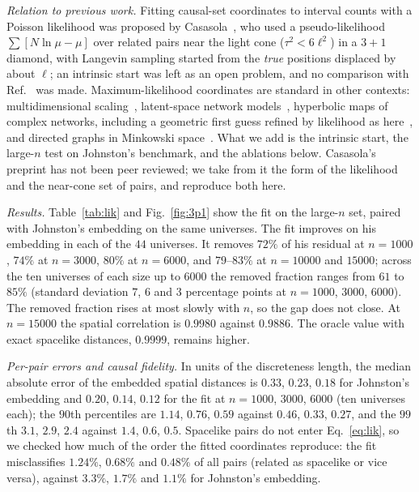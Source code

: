 \documentclass[prd,twocolumn,superscriptaddress,nofootinbib,amsmath,amssymb,floatfix]{revtex4-2}
\begin{document}
\emph{Relation to previous work.} Fitting causal-set coordinates to interval counts with a Poisson likelihood was proposed by Casasola~\cite{Casasola26}, who used a pseudo-likelihood $\sum[N\ln\mu-\mu]$ over related pairs near the light cone ($\tau^2<6\ell^2$) in a $3+1$ diamond, with Langevin sampling started from the \emph{true} positions displaced by about $\ell$; an intrinsic start was left as an open problem, and no comparison with Ref.~\cite{Johnston25} was made. Maximum-likelihood coordinates are standard in other contexts: multidimensional scaling~\cite{Ramsay77}, latent-space network models~\cite{Hoff02}, hyperbolic maps of complex networks, including a geometric first guess refined by likelihood as here~\cite{BPK10,Mercator19}, and directed graphs in Minkowski space~\cite{Sim21}. What we add is the intrinsic start, the large-$n$ test on Johnston's benchmark, and the ablations below. Casasola's preprint has not been peer reviewed; we take from it the form of the likelihood and the near-cone set of pairs, and reproduce both here.

\emph{Results.} Table~\ref{tab:lik} and Fig.~\ref{fig:3p1} show the fit on the large-$n$ set, paired with Johnston's embedding on the same universes. The fit improves on his embedding in each of the $44$ universes. It removes $72\%$ of his residual at $n=1000$, $74\%$ at $n=3000$, $80\%$ at $n=6000$, and $79$--$83\%$ at $n=10000$ and $15000$; across the ten universes of each size up to $6000$ the removed fraction ranges from $61$ to $85\%$ (standard deviation $7$, $6$ and $3$ percentage points at $n=1000$, $3000$, $6000$). The removed fraction rises at most slowly with $n$, so the gap does not close. At $n=15000$ the spatial correlation is $0.9980$ against $0.9886$. The oracle value with exact spacelike distances, $0.9999$, remains higher.

\emph{Per-pair errors and causal fidelity.} In units of the discreteness length, the median absolute error of the embedded spatial distances is $0.33$, $0.23$, $0.18$ for Johnston's embedding and $0.20$, $0.14$, $0.12$ for the fit at $n=1000$, $3000$, $6000$ (ten universes each); the $90$th percentiles are $1.14$, $0.76$, $0.59$ against $0.46$, $0.33$, $0.27$, and the $99$th $3.1$, $2.9$, $2.4$ against $1.4$, $0.6$, $0.5$. Spacelike pairs do not enter Eq.~\eqref{eq:lik}, so we checked how much of the order the fitted coordinates reproduce: the fit misclassifies $1.24\%$, $0.68\%$ and $0.48\%$ of all pairs (related as spacelike or vice versa), against $3.3\%$, $1.7\%$ and $1.1\%$ for Johnston's embedding.
\end{document}
